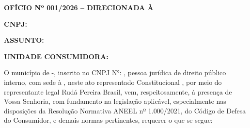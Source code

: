 \textbf{OFÍCIO Nº 001/2026 – DIRECIONADA À \nomeConcessionaria{}}

\textbf{CNPJ: \cnpjConcessionaria{}}

\textbf{ASSUNTO: \tituloDocumento{}}

\ifnum{}
\textbf{UNIDADE CONSUMIDORA: \unidadeConsumidora{}}
\fi

\vspace{0,25cm}

O município de \nomeMunicipio{}-\siglaEstado{}, inscrito no CNPJ N°: \cnpjMunicipio{}, pessoa jurídica de direito público interno, com sede à \sedePrefeitura{}, neste ato representado \generoPrefeitura{} Constitucional \nomePrefeito{}, por meio do representante legal Rudá Pereira Brasil, vem, respeitosamente, à presença de Vossa Senhoria, com fundamento na legislação aplicável, especialmente nas disposições da Resolução Normativa ANEEL nº 1.000/2021, do Código de Defesa do Consumidor, e demais normas pertinentes, requerer o que se segue:

